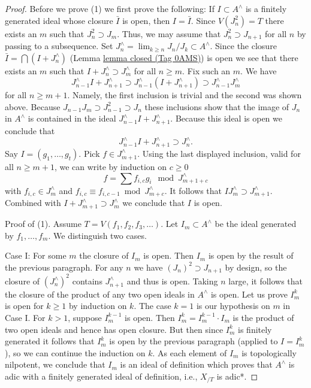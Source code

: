 \documentclass{amsart}
\theoremstyle{plain}
\theoremstyle{definition}
\theoremstyle{remark}
\numberwithin{equation}{subsection}
\def\lim{\mathop{\mathrm{lim}}\nolimits}
\begin{document}
\begin{proof}
\medskip\noindent
Before we prove (1) we first prove the following: If $I \subset A^\wedge$ is
a finitely generated ideal whose closure $\bar I$ is open, then $I = \bar I$.
Since $V(J_n^2) = T$ there exists an $m$ such that $J_n^2 \supset J_m$.
Thus, we may assume that $J_n^2 \supset J_{n + 1}$ for all $n$ by passing
to a subsequence. Set $J_n^\wedge = \lim_{k \geq n} J_n/J_k \subset A^\wedge$.
Since the closure $\bar I = \bigcap (I + J_n^\wedge)$
(Lemma \href{https://stacks.math.columbia.edu/tag/0AMS}{lemma closed (Tag 0AMS)}) is open we see that there exists an $m$ such that
$I + J_n^\wedge \supset J_m^\wedge$ for all $n \geq m$. Fix such an $m$.
We have
$$
J_{n - 1}^\wedge I + J_{n + 1}^\wedge \supset
J_{n - 1}^\wedge (I + J_{n + 1}^\wedge) \supset
J_{n - 1}^\wedge J_m^\wedge
$$
for all $n \geq m + 1$. Namely, the first inclusion is trivial and the
second was shown above. Because $J_{n - 1}J_m \supset J_{n - 1}^2 \supset J_n$
these inclusions show that the image of $J_n$ in $A^\wedge$
is contained in the ideal $J_{n - 1}^\wedge I + J_{n + 1}^\wedge$.
Because this ideal is open we conclude that
$$
J_{n - 1}^\wedge I + J_{n + 1}^\wedge \supset J_n^\wedge.
$$
Say $I = (g_1, \ldots, g_t)$. Pick $f \in J_{m + 1}^\wedge$.
Using the last displayed inclusion, valid for all $n \geq m + 1$,
we can write by induction on $c \geq 0$
$$
f = \sum f_{i, c} g_i \mod J_{m + 1+ c}^\wedge
$$
with $f_{i, c} \in J_m^\wedge$ and
$f_{i, c} \equiv f_{i, c - 1} \bmod J_{m + c}^\wedge$.
It follows that $IJ_m^\wedge \supset J_{m + 1}^\wedge$.
Combined with $I + J_{m + 1}^\wedge \supset J_m^\wedge$
we conclude that $I$ is open.

\medskip\noindent
Proof of (1). Assume $T = V(f_1, f_2, f_3, \ldots)$.
Let $I_m \subset A^\wedge$ be the ideal generated by $f_1, \ldots, f_m$.
We distinguish two cases.

\medskip\noindent
Case I: For some $m$ the closure of $I_m$ is open.
Then $I_m$ is open by the result of the previous paragraph.
For any $n$ we have $(J_n)^2 \supset J_{n+1}$ by design, so
the closure of $(J_n^\wedge)^2$ contains $J_{n+1}^\wedge$
and thus is open.  Taking $n$ large, it follows that the closure
of the product of any two open ideals in $A^\wedge$ is open.
Let us prove $I_m^k$ is open for $k \ge 1$ by induction on $k$.
The case $k = 1$ is our hypothesis on $m$ in Case I.
For $k > 1$, suppose $I_m^{k - 1}$ is open. Then
$I_m^k = I_m^{k - 1} \cdot I_m$ is the product of two open ideals
and hence has open closure. But then since $I_m^k$
is finitely generated it follows that $I_m^k$
is open by the previous paragraph (applied to $I = I_m^k$),
so we can continue the induction on $k$.
As each element of $I_m$ is topologically nilpotent, we conclude
that $I_m$ is an ideal of definition which proves that $A^\wedge$
is adic with a finitely generated ideal of definition, i.e.,
$X_{/T}$ is adic*.


\end{proof}
\end{document}
